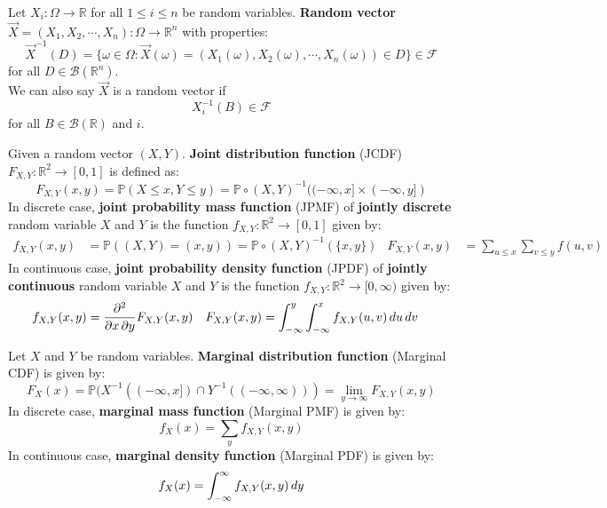 \documentclass{huhtakm-template-book}
\newcommand{\prob}{\mathbb{P}}
\begin{document}
    \newpage
    \begin{sdefn}
        Let $X_{i}:\Omega\to\mathbb{R}$ for all $1\leq i\leq n$ be random variables. \textbf{Random vector} $\vec{X}=(X_{1},X_{2},\cdots,X_{n}):\Omega\to\mathbb{R}^{n}$ with properties:
        \begin{equation*}
            \vec{X}^{-1}(D)=\{\omega\in\Omega:\vec{X}(\omega)=(X_{1}(\omega),X_{2}(\omega),\cdots,X_{n}(\omega))\in D\}\in\mathcal{F}
        \end{equation*}
        for all $D\in\mathcal{B}(\mathbb{R}^{n})$.\\
        We can also say $\vec{X}$ is a random vector if
        \begin{equation*}
            X_{i}^{-1}(B)\in\mathcal{F}
        \end{equation*}
        for all $B\in\mathcal{B}(\mathbb{R})$ and $i$.
    \end{sdefn}
    \begin{sdefn}
        Given a random vector $(X,Y)$. \textbf{Joint distribution function} (JCDF) $F_{X,Y}:\mathbb{R}^{2}\to[0,1]$ is defined as:
        \begin{equation*}
            F_{X,Y}(x,y)=\prob(X\leq x,Y\leq y)=\prob\circ(X,Y)^{-1}((-\infty,x]\times(-\infty,y])
        \end{equation*}
        In discrete case, \textbf{joint probability mass function} (JPMF) of \textbf{jointly discrete} random variable $X$ and $Y$ is the function $f_{X,Y}:\mathbb{R}^{2}\to[0,1]$ given by:
        \begin{align*}
            f_{X,Y}(x,y)&=\prob((X,Y)=(x,y))=\prob\circ(X,Y)^{-1}(\{x,y\}) & F_{X,Y}(x,y)&=\sum_{u\leq x}\sum_{v\leq y}f(u,v)
        \end{align*}
        In continuous case, \textbf{joint probability density function} (JPDF) of \textbf{jointly continuous} random variable $X$ and $Y$ is the function $f_{X,Y}:\mathbb{R}^{2}\to[0,\infty)$ given by:
        \begin{align*}
            f_{X,Y}(x,y)&=\pdv*{F_{X,Y}(x,y)}{x,y} & F_{X,Y}(x,y)&=\int_{-\infty}^{y}\int_{-\infty}^{x}f_{X,Y}(u,v)\,du\,dv
        \end{align*}
    \end{sdefn}
    \begin{sdefn}
        Let $X$ and $Y$ be random variables. \textbf{Marginal distribution function} (Marginal CDF) is given by:
        \begin{equation*}
            F_{X}(x)=\prob(X^{-1}((-\infty,x])\cap Y^{-1}((-\infty,\infty)))=\lim_{y\to\infty}F_{X,Y}(x,y)
        \end{equation*}
        In discrete case, \textbf{marginal mass function} (Marginal PMF) is given by:
        \begin{equation*}
            f_{X}(x)=\sum_{y}f_{X,Y}(x,y)
        \end{equation*}
        In continuous case, \textbf{marginal density function} (Marginal PDF) is given by:
        \begin{equation*}
            f_{X}(x)=\int_{-\infty}^{\infty} f_{X,Y}(x,y)\,dy
        \end{equation*}
    \end{sdefn}
\end{document}
